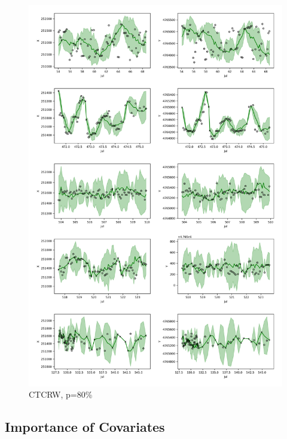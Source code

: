 \documentclass[11pt]{article}
\begin{document}
\begin{figure}[h]
  \centering
  \includegraphics[width=\textwidth]{../figure/80_5094_crawl} %
  \caption{CTCRW, p=80\%}
  \label{fig: ctcrw_80} %
\end{figure}

\subsection{Importance of Covariates}
\end{document}
